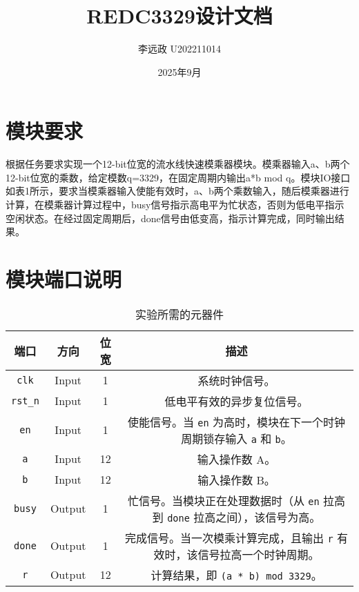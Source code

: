 \documentclass[UTF8]{ctexart}
\title{REDC3329设计文档}
\author{李远政 U202211014}
\date{2025年9月}
\begin{document}
	\maketitle
	\tableofcontents
	\newpage
	\fancyfoot[C]{\thepage}
	\section{模块要求}
根据任务要求实现一个12-bit位宽的流水线快速模乘器模块。模乘器输入a、b两个12-bit位宽的乘数，给定模数q=3329，在固定周期内输出a*b mod q。模块IO接口如表1所示，要求当模乘器输入使能有效时，a、b两个乘数输入，随后模乘器进行计算，在模乘器计算过程中，busy信号指示高电平为忙状态，否则为低电平指示空闲状态。在经过固定周期后，done信号由低变高，指示计算完成，同时输出结果。
	\section{模块端口说明}

	\begin{table}[h!]
		\begin{center}
			\caption{实验所需的元器件}
			\setlength{\tabcolsep}{2pt}
			\begin{tabular}{c c c c}
\toprule
        \textbf{端口} & \textbf{方向} & \textbf{位宽} & \textbf{描述} \\
        \midrule
        \texttt{clk}   & Input  & 1  & 系统时钟信号。 \\
        \texttt{rst\_n} & Input  & 1  & 低电平有效的异步复位信号。 \\
        \texttt{en}    & Input  & 1  & 使能信号。当 \texttt{en} 为高时，模块在下一个时钟周期锁存输入 \texttt{a} 和 \texttt{b}。 \\
        \texttt{a}     & Input  & 12 & 输入操作数 A。 \\
        \texttt{b}     & Input  & 12 & 输入操作数 B。 \\
        \texttt{busy}  & Output & 1  & 忙信号。当模块正在处理数据时（从 \texttt{en} 拉高到 \texttt{done} 拉高之间），该信号为高。 \\
        \texttt{done}  & Output & 1  & 完成信号。当一次模乘计算完成，且输出 \texttt{r} 有效时，该信号拉高一个时钟周期。 \\
        \texttt{r}     & Output & 12 & 计算结果，即 \texttt{(a * b) mod 3329}。 \\
        \bottomrule
			\end{tabular}
		\end{center}
	\end{table}
\end{document}
